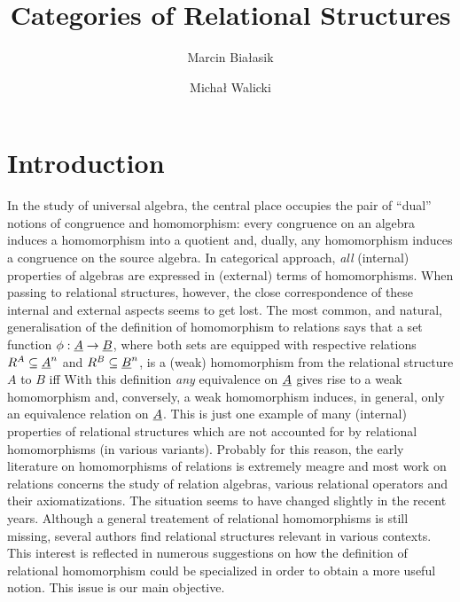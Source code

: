\documentclass[10pt]{article}
\title{Categories of Relational Structures}
\author{{Marcin Bia{\l}asik} \and {Micha{\l} Walicki}}
\date{}
\begin{document}
 

\maketitle


\section{Introduction}

In the study of universal algebra, the central place occupies the pair
of ``dual'' notions of congruence and homomorphism: every congruence
on an algebra induces a homomorphism into a quotient and, dually, any
homomorphism induces a congruence on the source algebra.  
In categorical approach, {\em all} (internal) properties of algebras
are expressed in (external) terms of homomorphisms. 
When passing to relational structures, however, the close correspondence of 
these internal and external aspects seems to get lost.
The most common,
and natural, generalisation of the definition of homomorphism to
relations says that a set function $\phi:\underline {A}\rightarrow \underline {B}$,
where both sets are equipped with respective relations $R^A\subseteq
\underline {A}^n$ and $R^B\subseteq \underline {B}^n$, is a (weak) homomorphism
from the relational structure $A$ to $B$ iff 
With this definition
{\em any} equivalence on $\underline {A}$ gives rise to a weak homomorphism
and, conversely, a weak homomorphism induces, in general, only an
equivalence relation on $\underline {A}$.
This is just one example of many (internal) properties of relational 
structures which are not accounted for by relational homomorphisms
(in various variants).
Probably for this reason, the early literature on homomorphisms of relations 
is extremely
meagre \cite{Most,c:101} and most work on relations concerns the
study of relation algebras, various relational operators and their
axiomatizations.  The situation seems to have changed slightly in the
recent years. Although a general treatement of relational
homomorphisms is still missing, several authors find relational
structures relevant in various contexts. This interest is reflected in
numerous suggestions on how the definition of relational homomorphism
could be specialized in order to obtain a more useful notion. 
This issue is our main objective.
\end{document}
